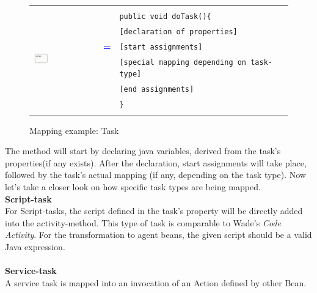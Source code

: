 \begin{figure}[h]
\centering%
\begin{tabularx}{\linewidth}{lcX}
	\multirow{8}{*}{\includegraphics[width=0.25\textwidth]{images/mapping/task.png}} &  &\\
	& & \texttt{public void doTask()\{}\\
	& & \texttt{\hspace{10pt}[declaration of properties]}\\
	& \textbf{\textcolor{blue}{=}} & \texttt{\hspace{10pt}[start assignments]}\\
	& & \texttt{\hspace{10pt}[special mapping depending on task-type]}\\
	& & \texttt{\hspace{10pt}[end assignments]}\\
	& & \texttt{\}}\\
	& & \\
\end{tabularx}
\caption{Mapping example: Task}%
\label{fig:mapping_task}%
\end{figure}

The method will start by declaring java variables, derived from the task's properties(if any exists). After the declaration, start assignments will take place, followed by the task's actual mapping (if any, depending on the task type). Now let's take a closer look on how specific task types are being mapped.\\

\textbf{Script-task}\\
For Script-tasks, the script defined in the task's property will be directly added into the activity-method. This type of task is comparable to Wade's \textit{Code Activity}. For the transformation to agent beans, the given script should be a valid Java expression.\\\\

\textbf{Service-task}\\
A service task is mapped into an invocation of an Action defined by other Bean.\\

